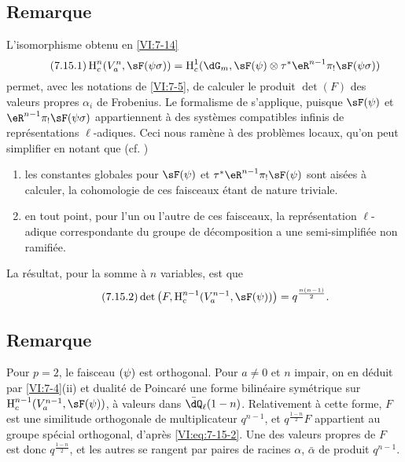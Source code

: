 




\subsection{Remarque}\label{VI:7-15}

L'isomorphisme obtenu en \ref{VI:7-14} 
\begin{equation*}\tag{7.15.1}\label{VI:eq:7-15-1}
  \h_c^n(V_a^n,\sF(\psi\sigma)) = \h_c^1(\dG_m,\sF(\psi)\otimes \tau^\ast \eR^{n-1} \pi_! \sF(\psi\sigma)) 
\end{equation*}
permet, avec les notations de \ref{VI:7-5}, de calculer le produit $\det(F)$ 
des valeurs propres $\alpha_i$ de Frobenius. Le formalisme de \cite{de73} 
s'applique, puisque $\sF(\psi)$ et $\eR^{n-1} \pi_! \sF(\psi\sigma)$ 
appartiennent à des systèmes compatibles infinis de représentations 
$\ell$-adiques. Ceci nous ramène à des problèmes locaux, qu'on peut 
simplifier en notant que (cf. \cite[9.5]{de73}) 
\begin{enumerate}[\indent a)]
  \item les constantes globales pour 
    $\sF(\psi)$ et $\tau^\ast \eR^{n-1} \pi_! \sF(\psi)$ sont aisées à 
    calculer, la cohomologie de ces faisceaux étant de nature triviale. 
  \item en tout point, pour l'un ou l'autre de ces faisceaux, la 
    représentation $\ell$-adique correspondante du groupe de décomposition 
    a une semi-simplifiée non ramifiée. 
\end{enumerate}

La résultat, pour la somme à $n$ variables, est que 
\begin{equation*}\tag{7.15.2}\label{VI:eq:7-15-2}
  \det\left(F,\h_c^{n-1}(V_a^{n-1},\sF(\psi))\right) = q^{\frac{n(n-1)}{2}} \text{.} 
\end{equation*}





\subsection{Remarque}\label{VI:7-16}

Pour $p=2$, le faisceau $\sf(\psi)$ est orthogonal. Pour $a\ne 0$ et $n$ 
impair, on en déduit par \ref{VI:7-4}(ii) et dualité de Poincaré une 
forme bilinéaire symétrique sur $\h_c^{n-1}(V_a^{n-1},\sF(\psi))$, à 
valeurs dans $\bar\dQ_\ell(1-n)$. Relativement à cette forme, $F$ est une 
similitude orthogonale de multiplicateur $q^{n-1}$, et $q^{\frac{1-n}{2}} F$ 
appartient au groupe spécial orthogonal, d'après \eqref{VI:eq:7-15-2}. Une 
des valeurs propres de $F$ est donc $q^{\frac{1-n}{2}}$, et les autres se 
rangent par paires de racines $\alpha$, $\bar\alpha$ de produit $q^{n-1}$. 

